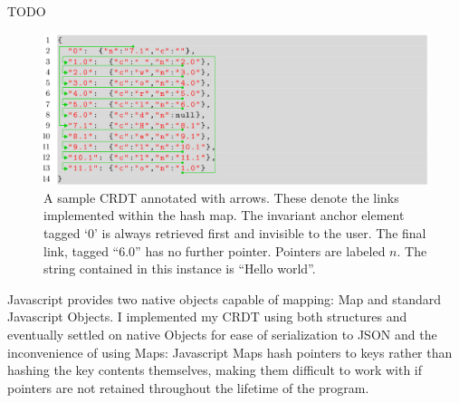 \documentclass[12pt,a4paper,twoside,openright]{report}
\begin{document}

TODO

	\begin{figure}[H]
		\centering
		\includegraphics[width=1\linewidth]{figs/hash_list.eps}
		\caption[Annotated CRDT]{A sample CRDT annotated with arrows. These denote the links implemented within the hash map. The invariant anchor element tagged `0' is always retrieved first and invisible to the user. The final link, tagged ``6.0'' has no further pointer. Pointers are labeled $n$. The string contained in this instance is ``Hello world''.}
		\label{fig:hashlist}
		\end{figure}
		
		Javascript provides two native objects capable of mapping: Map and standard Javascript Objects. I implemented my CRDT using both structures and eventually settled on native Objects for ease of serialization to JSON and the inconvenience of using Maps: Javascript Maps hash pointers to keys rather than hashing the key contents themselves, making them difficult to work with if pointers are not retained throughout the lifetime of the program.
		
\end{document}
